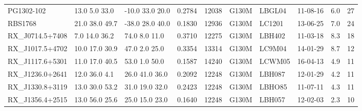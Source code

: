 \documentclass[iop]{emulateapj-rtx4}
\begin{document}
\begin{table}[ht]
\begin{center}
\begin{tabular}{l l l l l l l l l l}
PG1302-102  		&    13.0  5.0  33.0  &    -10.0  33.0  20.0  &   0.2784  & 12038  		    &   G130M  &   LBGL04  		& 11-08-16  		   &  6.0   &      27         \\
RBS1768  		&  21.0  38.0  49.7  &    -38.0  28.0  40.0  &   0.1830  & 12936  		    &   G130M  &   LC1201 		& 13-06-25		   &  7.0   &      24         \\
RX\_J0714.5+7408  &     7.0  14.0  36.2  &      74.0  8.0  11.0   &   0.3710  & 12275  		    &   G130M  &   LBH402   		& 11-03-18   		   &  8.3   &      18         \\
RX\_J1017.5+4702  &   10.0  17.0  30.9  &      47.0  2.0  25.0   &   0.3354  & 13314  		    &   G130M  &   LC9M04		& 14-01-29		   &  8.7   &      12         \\
RX\_J1117.6+5301  &    11.0  17.0  40.5  &      53.0  1.0  50.0   &   0.1587  & 14240  		    &   G130M  &   LCWM05		& 16-04-13		   &  4.9   &      11         \\
RX\_J1236.0+2641  &     12.0  36.0  4.1  &    26.0  41.0  36.0   &   0.2092  & 12248  		    &   G130M  &   LBH087  		& 12-01-29  		   &  4.2   &      11         \\
RX\_J1330.8+3119  &   13.0  30.0  53.2  &    31.0  19.0  32.0   &   0.2423  & 12248  		    &   G130M  &   LBHO85  		& 11-07-11		   &   4.3  &      11         \\
RX\_J1356.4+2515  &   13.0  56.0  25.6  &    25.0  15.0  23.0   &   0.1640  & 12248  		    &   G130M  &   LBH057			& 12-02-03		   &   2.3  &      10         \\

\end{tabular}
\end{center}
\end{table}
\end{document}
